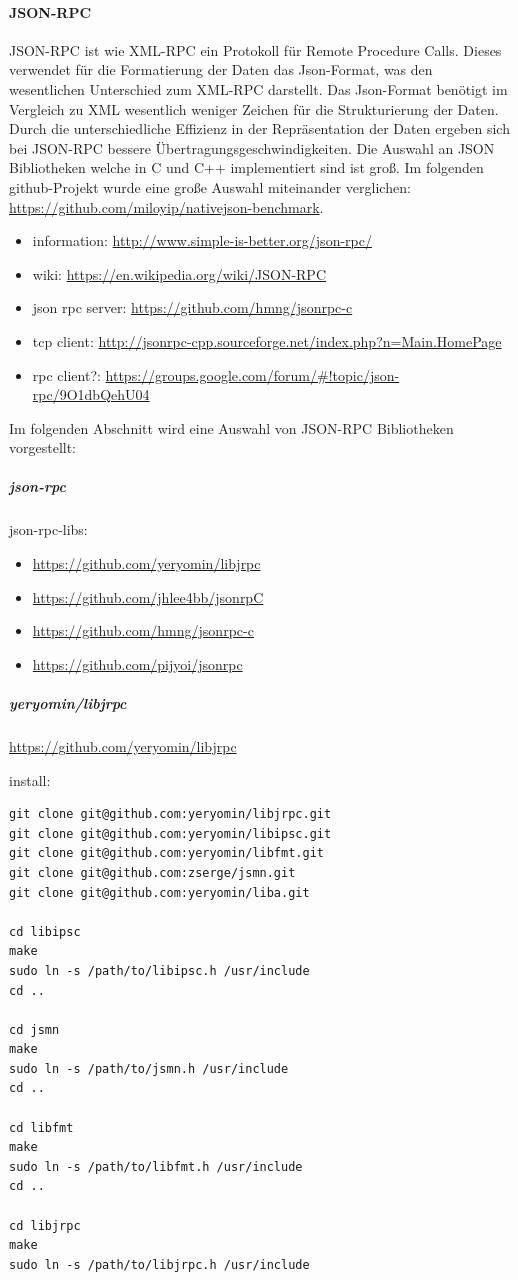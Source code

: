 \documentclass[a4paper,10pt]{article}
\begin{document}
\paragraph{JSON-RPC}

JSON-RPC ist wie XML-RPC ein Protokoll für Remote Procedure Calls.
Dieses verwendet für die Formatierung der Daten das Json-Format, was den wesentlichen Unterschied zum XML-RPC darstellt.
Das Json-Format benötigt im Vergleich zu XML wesentlich weniger Zeichen für die Strukturierung der Daten.
Durch die unterschiedliche Effizienz in der Repräsentation der Daten ergeben sich bei JSON-RPC bessere Übertragungsgeschwindigkeiten.
Die Auswahl an JSON Bibliotheken welche in C und C++ implementiert sind ist groß.
Im folgenden github-Projekt wurde eine große Auswahl miteinander verglichen: \url{https://github.com/miloyip/nativejson-benchmark}.

\begin{itemize}
 \item information: \url{http://www.simple-is-better.org/json-rpc/}
 \item wiki: \url{https://en.wikipedia.org/wiki/JSON-RPC}
 \item json rpc server: \url{https://github.com/hmng/jsonrpc-c}
 \item tcp client: \url{http://jsonrpc-cpp.sourceforge.net/index.php?n=Main.HomePage}
 \item rpc client?: \url{https://groups.google.com/forum/#!topic/json-rpc/9O1dbQehU04}
\end{itemize}

Im folgenden Abschnitt wird eine Auswahl von JSON-RPC Bibliotheken vorgestellt:

\subparagraph{json-rpc}

json-rpc-libs:
\begin{itemize}
 \item \url{https://github.com/yeryomin/libjrpc}
 \item \url{https://github.com/jhlee4bb/jsonrpC}
 \item \url{https://github.com/hmng/jsonrpc-c}
 \item \url{https://github.com/pijyoi/jsonrpc}
\end{itemize}

\subparagraph{yeryomin/libjrpc}

\url{https://github.com/yeryomin/libjrpc}

install:

\begin{lstlisting}[frame=single,caption=yeryomin/libjrpc Installation]
git clone git@github.com:yeryomin/libjrpc.git
git clone git@github.com:yeryomin/libipsc.git
git clone git@github.com:yeryomin/libfmt.git
git clone git@github.com:zserge/jsmn.git
git clone git@github.com:yeryomin/liba.git

cd libipsc
make
sudo ln -s /path/to/libipsc.h /usr/include
cd ..

cd jsmn
make
sudo ln -s /path/to/jsmn.h /usr/include
cd ..

cd libfmt
make
sudo ln -s /path/to/libfmt.h /usr/include
cd ..

cd libjrpc
make
sudo ln -s /path/to/libjrpc.h /usr/include
\end{lstlisting}
\end{document}
